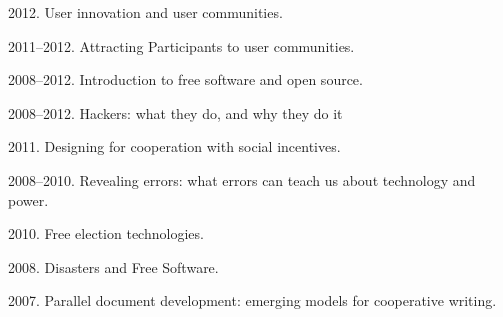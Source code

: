 \documentclass[10pt]{article}
\newenvironment{cvlist}{
\begin{list}{}{\leftmargin=3.0em \itemindent=-3.0em}
  \setlength{\itemsep}{0pt}
  \setlength{\parskip}{0em}
  \setlength{\parsep}{1em}
  \setlength{\parindent}{0em}}
{\vspace{1em}
\end{list}}
\begin{document}
\begin{cvlist}

\item 2012. User innovation and user communities.
\item 2011--2012. Attracting Participants to user communities.
\item 2008--2012. Introduction to free software and open source.
\item 2008--2012. Hackers: what they do, and why they do it
\item 2011. Designing for cooperation with social incentives.
\item 2008--2010. Revealing errors: what errors can teach us about technology and power.
\item 2010. Free election technologies.
\item 2008. Disasters and Free Software.
\item 2007. Parallel document development: emerging models for
  cooperative writing.






\end{cvlist}
\end{document}
